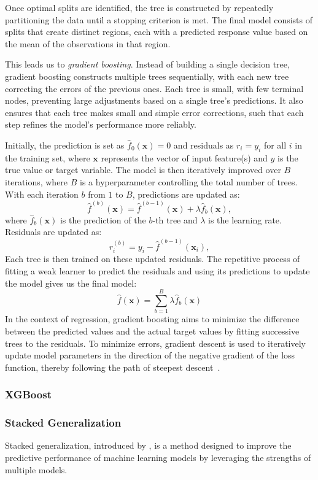 Once optimal splits are identified, the tree is constructed by repeatedly partitioning the data until a stopping criterion is met.
The final model consists of splits that create distinct regions, each with a predicted response value based on the mean of the observations in that region.

This leads us to \textit{gradient boosting}.
Instead of building a single decision tree, gradient boosting constructs multiple trees sequentially, with each new tree correcting the errors of the previous ones.
Each tree is small, with few terminal nodes, preventing large adjustments based on a single tree's predictions.
It also ensures that each tree makes small and simple error corrections, such that each step refines the model's performance more reliably.

Initially, the prediction is set as $\hat{f}_0(\mathbf{x}) = 0$ and residuals as $r_i = y_i$ for all $i$ in the training set, where $\mathbf{x}$ represents the vector of input feature(s) and $y$ is the true value or target variable.
The model is then iteratively improved over $B$ iterations, where $B$ is a hyperparameter controlling the total number of trees.
With each iteration $b$ from $1$ to $B$, predictions are updated as:
$$
    \hat{f}^{(b)}(\mathbf{x}) = \hat{f}^{(b-1)}(\mathbf{x}) + \lambda \hat{f}_b(\mathbf{x}),
$$
where $\hat{f}_b(\mathbf{x})$ is the prediction of the $b$-th tree and $\lambda$ is the learning rate. Residuals are updated as:
$$
    r_i^{(b)} = y_i - \hat{f}^{(b-1)}(\mathbf{x}_i),
$$
Each tree is then trained on these updated residuals.
The repetitive process of fitting a weak learner to predict the residuals and using its predictions to update the model gives us the final model:
$$
    \hat{f}(\mathbf{x}) = \sum_{b=1}^{B} \lambda \hat{f}_b(\mathbf{x})
$$
In the context of regression, gradient boosting aims to minimize the difference between the predicted values and the actual target values by fitting successive trees to the residuals.
To minimize errors, gradient descent is used to iteratively update model parameters in the direction of the negative gradient of the loss function, thereby following the path of steepest descent~\cite{gradientLossFunction}.


\subsubsection{XGBoost}

\subsubsection{Stacked Generalization}
Stacked generalization, introduced by \citet{wolpertstacked_1992}, is a method designed to improve the predictive performance of machine learning models by leveraging the strengths of multiple models.

